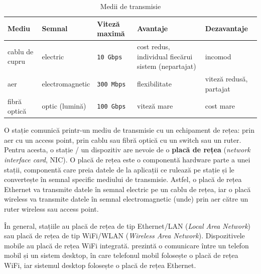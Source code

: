 \begin{table}[!htb]
  \scriptsize
  \begin{center}
    \begin{tabular}{ p{} p{} p{} p{} p{} }
      \toprule
        \textbf{Mediu} &
        \textbf{Semnal} &
        \textbf{Viteză maximă} &
        \textbf{Avantaje} &
        \textbf{Dezavantaje} \\
      \midrule
        cablu de cupru &
        electric &
        \texttt{10 Gbps} &
        cost redus, individual fiecărui sistem (nepartajat) &
        incomod \\

      \midrule
        aer &
        electromagnetic &
        \texttt{300 Mbps} &
        flexibilitate &
        viteză redusă, partajat \\

      \midrule
        fibră optică &
        optic (lumină) &
        \texttt{100 Gbps} &
        viteză mare &
        cost mare \\
      \bottomrule
    \end{tabular}
  \end{center}
  \caption{Medii de transmisie}
  \label{tab:net:media}
\end{table}

O stație comunică printr-un mediu de transmisie cu un echipament de rețea: prin aer cu un access point, prin cablu sau fibră optică cu un switch sau un ruter.
Pentru acesta, o stație / un dispozitiv are nevoie de o \textbf{placă de rețea} (\textit{network interface card}, NIC).
O placă de rețea este o componentă hardware parte a unei stații, componentă care preia datele de la aplicații ce rulează pe stație și le convertește în semnal specific mediului de transmisie.
Astfel, o placă de rețea Ethernet va transmite datele în semnal electric pe un cablu de rețea, iar o placă wireless va transmite datele în semnal electromagnetic (unde) prin aer către un ruter wireless sau access point.

În general, stațiile au placă de rețea de tip Ethernet/LAN (\textit{Local Area Network}) sau placă de rețea de tip WiFi/WLAN  (\textit{Wireless Area Network}).
Dispozitivele mobile au placă de rețea WiFi integrată.
 prezintă o comunicare între un telefon mobil și un sistem desktop, în care telefonul mobil folosește o placă de rețea WiFi, iar sistemul desktop folosește o placă de rețea Ethernet.

